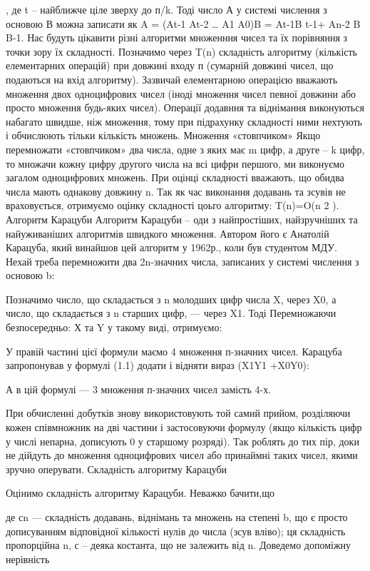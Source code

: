 , де t – найближче ціле зверху до п/k. Тоді число А у системі
числення з основою В можна записати як
A = (At-1 At-2 … A1 A0)B = At-1B
t-1+ An-2 B B-1.
 Нас будуть цікавити різні алгоритми множенння чисел та їх порівняння з
точки зору їх складності. Позначимо через T(n) складність алгоритму (кількість
елементарних операцій) при довжині входу п (сумарній довжині чисел, що
подаються на вхід алгоритму). Зазвичай елементарною операцією вважають
множення двох одноцифрових чисел (іноді множення чисел певної довжини
або просто множення будь-яких чисел). Операції додавння та віднімання
виконуються набагато швидше, ніж множення, тому при підрахунку складності
ними нехтують і обчислюють тільки кількість множень.
Множення «стовпчиком»
 Якщо перемножати «стовпчиком» два числа, одне з яких має m цифр, а
друге – k цифр, то множачи кожну цифру другого числа на всі цифри першого,
ми виконуємо загалом  одноцифрових множень. При оцінці складності
вважають, що обидва числа мають однакову довжину n. Так як час виконання
додавань та зсувів не враховується, отримуємо оцінку складності цоьго
алгоритму:
T(n)=O(n
2
).
Алгоритм Карацуби
Алгоритм Карацуби – оди з найпростіших, найзручніших та
найуживаніших алгоритмів швидкого множення. Автором його є Анатолій
Карацуба, який винайшов цей алгоритм у 1962р., коли був студентом МДУ.
Нехай треба перемножити два 2n-значних числа, записаних у системі
числення з основою b:

Позначимо число, що складається з n молодших цифр числа X, через X0, а
число, що складається з n старших цифр, --- через X1. Тоді
Перемножаючи безпосередньо: Х та Y у такому виді, отримуємо:



У правій частині цієї формули маємо 4 множення п-значних чисел.
Карацуба запропонував у формулі (1.1) додати і відняти вираз (X1Y1 +X0Y0):



А в цій формулі --- 3 множення п-значних чисел замість 4-х.

При обчисленні добутків  знову використовують
той самий прийом, розділяючи кожен співмножник на дві частини і
застосовуючи формулу  (якщо кількість цифр у числі непарна, дописують 0
у старшому розряді). Так роблять до тих пір, доки не дійдуть до множення
одноцифрових чисел або принаймні таких чисел, якими зручно оперувати.
Складність алгоритму Карацуби

Оцінимо складність алгоритму Карацуби.
Неважко бачити,що


де сn --- складність додавань, віднімань та множень на степені b, що є просто
дописуванням відповідної кількості нулів до числа (зсув вліво); ця складність
пропорційна n, с – деяка костанта, що не залежить від n.
Доведемо допоміжну нерівність


